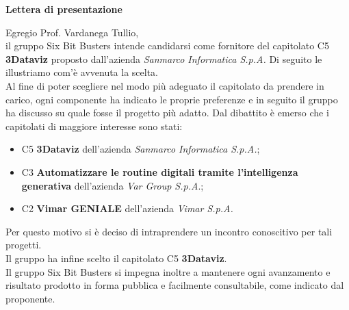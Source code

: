 \begin{titlepage}
\begin{center}
	{\Huge{ \textbf{Lettera di presentazione} } }\\[1cm]
        \end{center}
	\hspace{0.5cm}Egregio Prof. Vardanega Tullio, \\
        il gruppo Six Bit Busters intende candidarsi come fornitore del capitolato C5 \textbf{3Dataviz} proposto dall’azienda \textit{Sanmarco Informatica S.p.A.} Di seguito le illustriamo com'è avvenuta la scelta. \\
        \hspace{0.5cm}Al fine di poter scegliere nel modo più adeguato il capitolato da prendere in carico, ogni componente ha indicato le proprie preferenze e in seguito il gruppo ha discusso su quale fosse il progetto più adatto. Dal dibattito è emerso che i capitolati di maggiore interesse sono stati:
        \begin{itemize}
            \item C5 \textbf{3Dataviz} dell’azienda \textit{Sanmarco Informatica S.p.A.};
            \item C3 \textbf{Automatizzare le routine digitali tramite l’intelligenza generativa} dell’azienda \textit{Var Group S.p.A}.;
            \item C2 \textbf{Vimar GENIALE} dell’azienda \textit{Vimar S.p.A.}
        \end{itemize}
        Per questo motivo si è deciso di intraprendere un incontro conoscitivo per tali progetti. \\Il gruppo ha infine scelto il capitolato C5\textbf{ 3Dataviz}.\\
        Il gruppo Six Bit Busters si impegna inoltre a mantenere ogni avanzamento e risultato prodotto in forma pubblica e facilmente consultabile, come indicato dal proponente.
	
	
	
\end{titlepage}
